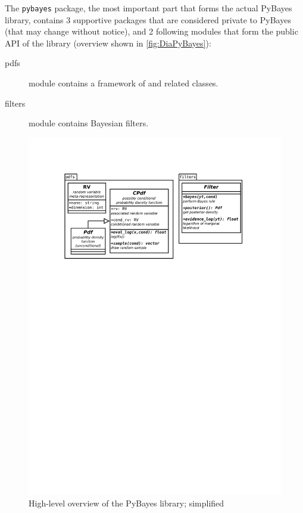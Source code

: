 The \verb|pybayes| package, the most important part that forms the actual PyBayes library, contains
3 supportive packages that are considered private to PyBayes (that may change without notice), and
2 following modules that form the public API of the library (overview shown in \autoref{fig:DiaPyBayes}):
\begin{description}
	\item[pdfs] module contains a framework of {\pdfs} and related classes.
	\item[filters] module contains Bayesian filters.
\end{description}

\begin{figure}[h]
	\centering
	\includegraphics[width=\textwidth,keepaspectratio=true,clip=true,trim=3cm 196mm 3cm 3cm]{./diagrams/PyBayes.pdf}
	\vspace{-8mm}
	\caption{High-level overview of the PyBayes library; simplified}
	\label{fig:DiaPyBayes}
\end{figure}

